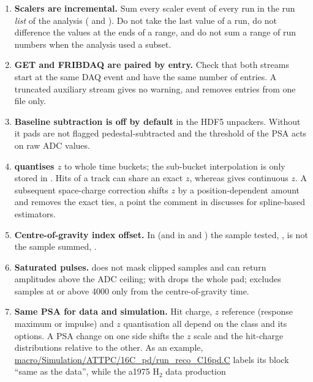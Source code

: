 \begin{enumerate}
  \item \textbf{Scalers are incremental.} Sum every scaler event of every run in the run
        \emph{list} of the analysis ( and ). Do not take the
        last value of a run, do not difference the values at the ends of a range, and do not sum a
        range of run numbers when the analysis used a subset.
  \item \textbf{GET and FRIBDAQ are paired by entry.} Check that both streams start at the same DAQ
        event and have the same number of entries. A truncated auxiliary stream gives no warning,
        and  removes entries from one file only.
  \item \textbf{Baseline subtraction is off by default} in the HDF5 unpackers. Without it pads are
        not flagged pedestal-subtracted and the threshold of the PSA acts on raw ADC values.
  \item \textbf{ quantises $z$} to whole time buckets; the sub-bucket
        interpolation is only stored in . Hits of a track can share an
        exact $z$, whereas  gives continuous $z$. A subsequent space-charge
        correction shifts $z$ by a position-dependent amount and removes the exact ties, a
        point the comment in  discusses for spline-based
        estimators.
  \item \textbf{Centre-of-gravity index offset.} In  (and in
         and ) the sample tested,
        , is not the sample summed, .
  \item \textbf{Saturated pulses.}  does not mask clipped samples and can
        return amplitudes above the ADC ceiling;  with 
        drops the whole pad;  excludes samples at or above 4000 only from the
        centre-of-gravity time.
  \item \textbf{Same PSA for data and simulation.} Hit charge, $z$ reference (response maximum
        or impulse) and $z$ quantisation all depend on the class and its options. A PSA change on
        one side shifts the $z$ scale and the hit-charge distributions relative to the other.
        As an example, \url{macro/Simulation/ATTPC/16C_pd/run_reco_C16pd.C} labels its
         block ``same as the data'', while the a1975 H$_2$ data production

\end{enumerate}

